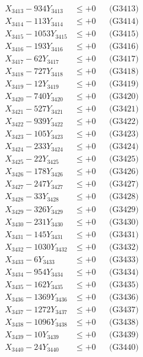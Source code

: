 \documentclass[a4paper,10pt]{article}
\begin{document}
{\begin{align}
X_{3413} - 934Y_{3413} &\leq +0 && \text{(G3413)} \\
X_{3414} - 113Y_{3414} &\leq +0 && \text{(G3414)} \\
X_{3415} - 1053Y_{3415} &\leq +0 && \text{(G3415)} \\
X_{3416} - 193Y_{3416} &\leq +0 && \text{(G3416)} \\
X_{3417} - 62Y_{3417} &\leq +0 && \text{(G3417)} \\
X_{3418} - 727Y_{3418} &\leq +0 && \text{(G3418)} \\
X_{3419} - 12Y_{3419} &\leq +0 && \text{(G3419)} \\
X_{3420} - 740Y_{3420} &\leq +0 && \text{(G3420)} \\
\allowbreak
X_{3421} - 527Y_{3421} &\leq +0 && \text{(G3421)} \\
X_{3422} - 939Y_{3422} &\leq +0 && \text{(G3422)} \\
X_{3423} - 105Y_{3423} &\leq +0 && \text{(G3423)} \\
X_{3424} - 233Y_{3424} &\leq +0 && \text{(G3424)} \\
X_{3425} - 22Y_{3425} &\leq +0 && \text{(G3425)} \\
X_{3426} - 178Y_{3426} &\leq +0 && \text{(G3426)} \\
X_{3427} - 247Y_{3427} &\leq +0 && \text{(G3427)} \\
X_{3428} - 33Y_{3428} &\leq +0 && \text{(G3428)} \\
X_{3429} - 326Y_{3429} &\leq +0 && \text{(G3429)} \\
X_{3430} - 231Y_{3430} &\leq +0 && \text{(G3430)} \\
\allowbreak
X_{3431} - 145Y_{3431} &\leq +0 && \text{(G3431)} \\
X_{3432} - 1030Y_{3432} &\leq +0 && \text{(G3432)} \\
X_{3433} - 6Y_{3433} &\leq +0 && \text{(G3433)} \\
X_{3434} - 954Y_{3434} &\leq +0 && \text{(G3434)} \\
X_{3435} - 162Y_{3435} &\leq +0 && \text{(G3435)} \\
X_{3436} - 1369Y_{3436} &\leq +0 && \text{(G3436)} \\
X_{3437} - 1272Y_{3437} &\leq +0 && \text{(G3437)} \\
X_{3438} - 1096Y_{3438} &\leq +0 && \text{(G3438)} \\
X_{3439} - 10Y_{3439} &\leq +0 && \text{(G3439)} \\
X_{3440} - 24Y_{3440} &\leq +0 && \text{(G3440)} \\

\end{align}}
\end{document}
